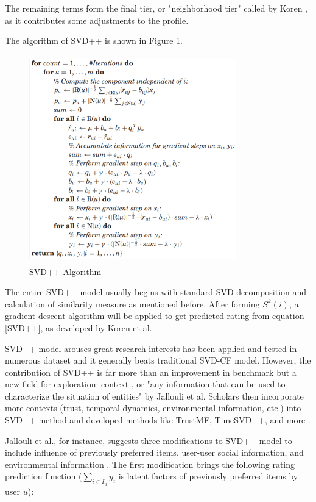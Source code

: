 \documentclass[letter paper, 11pt]{article}
\begin{document}
	The remaining terms form the final tier, or "neighborhood tier" called by Koren \cite{korenFactorization}, as it contributes some adjustments to the profile.
	
	The algorithm of SVD++ is shown in Figure \ref{SVD++-Algo}.
	
	\begin{figure}[H]
		\centering
		\caption{SVD++ Algorithm}
		\label{SVD++-Algo}
		\includegraphics[width=9cm, height=9cm]{SVD++.png}
	\end{figure}
	
	The entire SVD++ model usually begins with standard SVD decomposition and calculation of similarity measure as mentioned before. After forming $S^k(i)$, a gradient descent algorithm will be applied to get predicted rating from equation \ref{SVD++}, as developed by Koren et al\cite{koren2010}.  
	
	SVD++ model arouses great research interests has been applied and tested in numerous dataset \cite{SVD++performance} \cite{korenFactorization} and it generally beats traditional SVD-CF model. However, the contribution of SVD++ is far more than an improvement in benchmark but a new field for exploration: context \cite{contextual}, or "any information that can be used to characterize the situation of entities" by Jallouli et al. Scholars then incorporate more contexts (trust, temporal dynamics, environmental information, etc.) into SVD++ method and developed methods like TrustMF, TimeSVD++, and more \cite{contextual} \cite{review}.
	
			
	Jallouli et al., for instance, suggests three modifications to SVD++ model to include influence of previously preferred items, user-user social information, and environmental information \cite{contextual}. The first modification brings the following rating prediction function ($\sum_{i \in I_u} y_i$ is latent factors of previously preferred items by user $u$):
	
\end{document}
